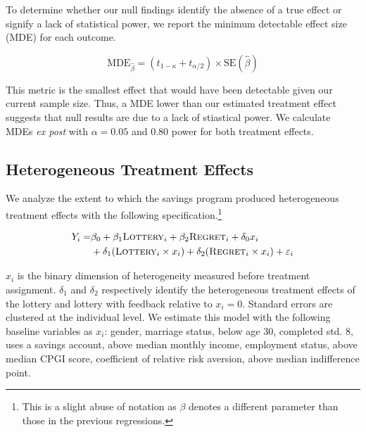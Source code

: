 \documentclass[12pt]{article}
\begin{document}
		To determine whether our null findings identify the absence of a true effect or signify a lack of statistical power, we report the minimum detectable effect size (MDE) for each outcome.

		\begin{equation}
			\mathrm{MDE}_{\hat \beta} = (t_{1-\kappa} + t_{\alpha/2}) \times \mathrm{SE}(\hat \beta)
		\label{eq:mde} \end{equation}

		This metric is the smallest effect that would have been detectable given our current sample size. Thus, a MDE lower than our estimated treatment effect suggests that null results are due to a lack of stiastical power. We calculate MDEs \textit{ex post} with $\alpha = 0.05$ and 0.80 power for both treatment effects.


	\subsection{Heterogeneous Treatment Effects}

		We analyze the extent to which the savings program produced heterogeneous treatment effects with the following specification.\footnote{This is a slight abuse of notation as $\beta$ denotes a different parameter than those in the previous regressions.}

		\begin{equation} \begin{split}
		Y_{i} = & \beta_{0} + \beta_{1}\text{\textsc{Lottery}}_{i} + \beta_{2}\text{\textsc{Regret}}_{i} + \delta_{0}x_{i} \\
					& + \delta_{1}(\text{\textsc{Lottery}}_{i} \times x_{i}) + \delta_{2}(\text{\textsc{Regret}}_{i} \times x_{i}) + \varepsilon_{i}
		\end{split} \label{eq:heteffect} \end{equation}

		$x_{i}$ is the binary dimension of heterogeneity measured before treatment assignment. $\delta_{1}$ and $\delta_{2}$ respectively identify the heterogeneous treatment effects of the lottery and lottery with feedback relative to $x_{i} = 0$. Standard errors are clustered at the individual level. We estimate this model with the following baseline variables as $x_{i}$: gender, marriage status, below age 30, completed std. 8, uses a savings account, above median monthly income, employment status, above median CPGI score, coefficient of relative risk aversion, above median indifference point.
\end{document}
